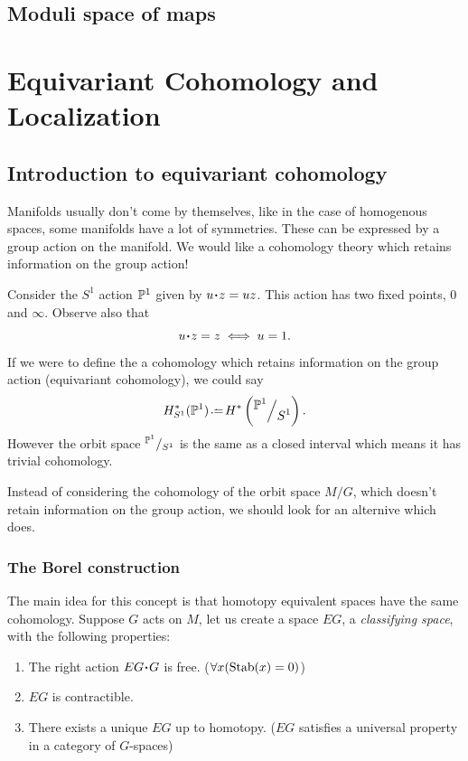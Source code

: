 \documentclass[12pt]{memoir}
\begin{document}
\section{Moduli space of maps}

\chapter{Equivariant Cohomology and Localization}

\section{Introduction to equivariant cohomology}

Manifolds usually don't come by themselves, like in the case of homogenous spaces, some manifolds have a lot of symmetries. These can be expressed by a group action on the manifold. We would like a cohomology theory which retains information on the group action!

\begin{Ex}
    Consider the $S^1$ action $\mathbb{P}^1$ given by $u\. z=uz$. This action has two fixed points, $0$ and $\infty$. Observe also that 
    $$u\.z=z\iff u=1.$$
    If we were to define the a cohomology which retains information on the group action (equivariant cohomology), we could say 
    $$H_{S^1}^\ast(\bP^1)\defeq H^\ast\left(\quot{\bP^1}{S^1}\right).$$
    However the orbit space $\quot{\bP^1}{S^1}$ is the same as a closed interval which means it has trivial cohomology.
\end{Ex}

Instead of considering the cohomology of the orbit space $M/G$, which doesn't retain information on the group action, we should look for an alternive which does.

\subsection{The Borel construction}

The main idea for this concept is that homotopy equivalent spaces have the same cohomology. Suppose $G$ acts on $M$, let us create a space $EG$, a \emph{classifying space}, with the following properties:

\begin{enumerate}
    \item The right action $EG\. G$ is free. ($\forall x(\operatorname{Stab}(x)=0)$)
    \item $EG$ is contractible. 
    \item There exists a unique $EG$ up to homotopy. ($EG$ satisfies a universal property in a category of $G$-spaces)
\end{enumerate}
\end{document}
